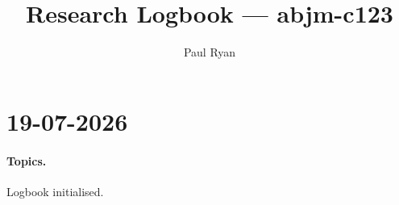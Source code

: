 \documentclass[12pt]{article}
\title{Research Logbook --- abjm-c123}
\author{Paul Ryan}
\begin{document}
\maketitle

\tableofcontents

\section{19-07-2026}

\paragraph{Topics.}
Logbook initialised.
\end{document}
